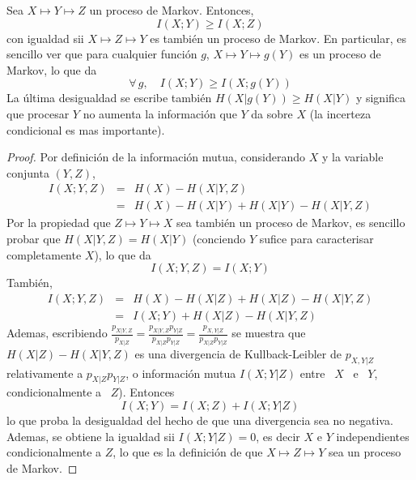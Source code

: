 \begin{teorema}
  Sea  $X \mapsto  Y \mapsto  Z$ un  proceso de  Markov. Entonces,
  \[
  I(X;Y) \ge I(X;Z)
  \]
  con igualdad sii $X \mapsto Z \mapsto Y$ es tambi\'en un proceso de Markov. En
  particular, es  sencillo ver  que para cualquier  funci\'on $g$, $X  \mapsto Y
  \mapsto g(Y)$ es un proceso de Markov,  lo que da
  \[
  \forall \, g, \quad I(X;Y) \ge I(X;g(Y))
  \]
  La  \'ultima  desigualdad  se  escribe  tambi\'en  $H(X|g(Y))  \ge  H(X|Y)$  y
  significa que  procesar $Y$ no aumenta  la informaci\'on que $Y$  da sobre $X$
  (la incerteza condicional es mas importante).
\end{teorema}
%
\begin{proof}
  Por definici\'on  de la  informaci\'on mutua, considerando  $X$ y  la variable
  conjunta $(Y,Z)$,
%
\begin{eqnarray*}
I(X ; Y,Z) & = & H(X) - H(X|Y,Z)\\[2.5mm]
%
& = & H(X) - H(X|Y) + H(X|Y) - H(X|Y,Z)
\end{eqnarray*}
%
\noindent Por la propiedad que $Z  \mapsto Y \mapsto X$ sea tambi\'en un proceso
de Markov, es sencillo probar que $H(X|Y,Z) = H(X|Y)$ (conciendo $Y$ sufice para
caracterisar completamente $X$), lo que da
%
\[
I(X;Y,Z) = I(X;Y)
\]
%
Tambi\'en,
%
\begin{eqnarray*}
I(X ; Y,Z) & = & H(X) - H(X|Z) + H(X|Z) - H(X|Y,Z)\\[2.5mm]
%
& = & I(X;Y) + H(X|Z) - H(X|Y,Z)
\end{eqnarray*}
%
\noindent  Ademas,   escribiendo  $\frac{p_{X|Y,Z}}{p_{X|Z}}  =  \frac{p_{X|Y,Z}
  p_{Y|Z}}{p_{X|Z} p_{Y|Z}} = \frac{p_{X,Y|Z}}{p_{X|Z} p_{Y|Z}}$
%
se muestra  que $H(X|Z)  - H(X|Y,Z)$ es  una divergencia de  Kullback-Leibler de
$p_{X,Y|Z}$ relativamente a $p_{X|Z}  p_{Y|Z}$, o informaci\'on mutua $I(X;Y|Z)$
entre \ $X$ \ e \ $Y$,  condicionalmente a \ $Z$).  Entonces
%
\[
I(X;Y) = I(X;Z) + I(X;Y|Z)
\]
%
lo  que  proba  la  desigualdad  del   hecho  de  que  una  divergencia  sea  no
negativa. Ademas, se obtiene la igualdad sii  $I(X;Y|Z) = 0$, es decir $X$ e $Y$
independientes  condicionalmente a  $Z$, lo  que es  la definici\'on  de  que $X
\mapsto Z \mapsto Y$ sea un proceso de Markov.
\end{proof}

